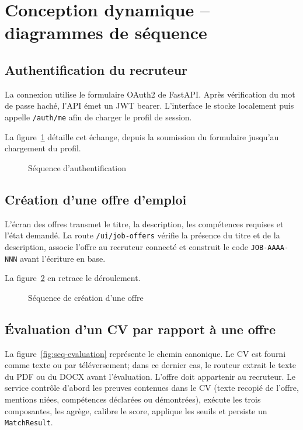 \section{Conception dynamique -- diagrammes de séquence}

\subsection{Authentification du recruteur}
La connexion utilise le formulaire OAuth2 de FastAPI. Après vérification du mot de passe haché, l'API émet un JWT bearer. L'interface le stocke localement puis appelle \texttt{/auth/me} afin de charger le profil de session.

La figure~\ref{fig:seq-auth} détaille cet échange, depuis la soumission du formulaire jusqu'au chargement du profil.

\begin{figure}[H]
\centering

\caption{Séquence d'authentification}
\label{fig:seq-auth}
\end{figure}

\subsection{Création d'une offre d'emploi}
L'écran des offres transmet le titre, la description, les compétences requises et l'état demandé. La route \texttt{/ui/job-offers} vérifie la présence du titre et de la description, associe l'offre au recruteur connecté et construit le code \texttt{JOB-AAAA-NNN} avant l'écriture en base.

La figure~\ref{fig:seq-offre} en retrace le déroulement.

\begin{figure}[H]
\centering

\caption{Séquence de création d'une offre}
\label{fig:seq-offre}
\end{figure}

\subsection{Évaluation d'un CV par rapport à une offre}
La figure~\ref{fig:seq-evaluation} représente le chemin canonique. Le CV est fourni comme texte ou par téléversement; dans ce dernier cas, le routeur extrait le texte du PDF ou du DOCX avant l'évaluation. L'offre doit appartenir au recruteur. Le service contrôle d'abord les preuves contenues dans le CV (texte recopié de l'offre, mentions niées, compétences déclarées ou démontrées), exécute les trois composantes, les agrège, calibre le score, applique les seuils et persiste un \texttt{MatchResult}.

